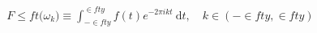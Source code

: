 \documentclass[preview]{standalone}
\begin{document}
\begin{align*}
F\le f t(\omega_{k}\big) \equiv \int_{-\in f ty}^{\in f ty}  f (t) e^{-2 \pi i k t} \mathrm{~d} t, \quad k \in(-\in f ty, \in f ty)
\end{align*}
\end{document}
